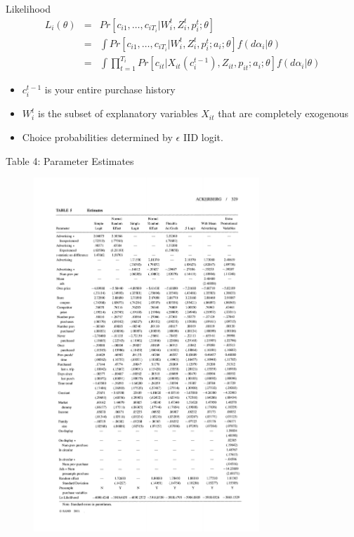 \documentclass[xcolor=pdftex,dvipsnames,table,mathserif,aspectratio=169]{beamer}
\begin{document}
\begin{frame}{Likelihood}
\begin{eqnarray*}
L_i(\theta) &=& Pr[c_{i1},\ldots,c_{iT_i} | W_i^t, Z_i^t, p_i^t; \theta] \\
&=& \int Pr[c_{i1},\ldots,c_{iT_i} | W_i^t, Z_i^t, p_i^t; a_i;  \theta] f(d \alpha_i | \theta)\\
&=& \int \prod_{t=1}^{T_i} Pr[c_{it}|  X_{it}(c_{i}^{t-1}), Z_{it}, p_{it}; a_i;  \theta] f(d \alpha_i | \theta)
\end{eqnarray*}
\begin{itemize}
\item $c_{i}^{t-1}$ is your entire purchase history
\item $W_{i}^t$ is the subset of explanatory variables $X_{it}$ that are completely exogenous
\item Choice probabilities determined by $\epsilon$ IID logit.
\end{itemize}
\end{frame}

\begin{frame}{Table 4: Parameter Estimates}
\begin{figure}[htbp]
\begin{center}
\includegraphics[width=8.5cm]{resources/acker4.pdf}
\label{default}
\end{center}
\end{figure}
\end{frame}
\end{document}
